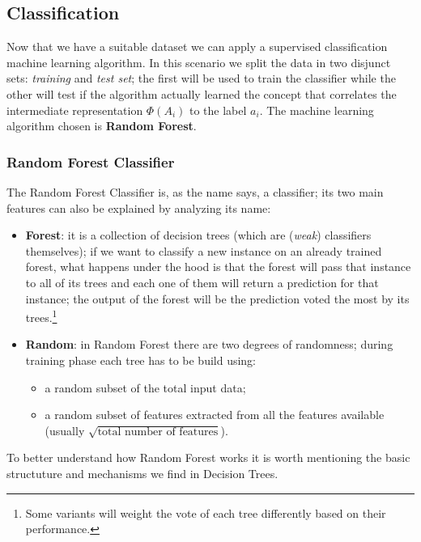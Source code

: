 \subsection{Classification}
Now that we have a suitable dataset we can apply a supervised classification machine learning algorithm. In this scenario we split the data in two disjunct sets: \textit{training} and \textit{test set}; the first will be used to train the classifier while the other will test if the algorithm actually learned the concept that correlates the intermediate representation $\Phi(A_i)$ to the label $a_i$. The machine learning algorithm chosen is \textbf{Random Forest}.

\subsubsection{Random Forest Classifier}
The Random Forest Classifier is, as the name says, a classifier; its two main features can also be explained by analyzing its name:
\begin{itemize}
 \item \textbf{Forest}: it is a collection of decision trees (which are (\textit{weak}) classifiers themselves); if we want to classify a new instance on an already trained forest, what happens under the hood is that the forest will pass that instance to all of its trees and each one of them will return a prediction for that instance; the output of the forest will be the prediction voted the most by its trees.\footnote{Some variants will weight the vote of each tree differently based on their performance.}
 \item \textbf{Random}: in Random Forest there are two degrees of randomness; during training phase each tree has to be build using:
 \begin{itemize}
  \item a random subset of the total input data;
  \item a random subset of features extracted from all the features available (usually $\sqrt{\text{total number of features}}$).
 \end{itemize}
\end{itemize}

To better understand how Random Forest works it is worth mentioning the basic structuture and mechanisms we find in Decision Trees. 

